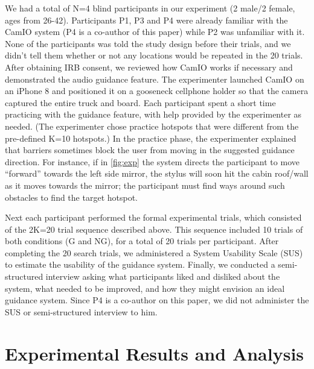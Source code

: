 \documentclass[runningheads]{res/templates/llncs}
\begin{document}
We had a total of N=4 blind participants in our experiment (2 male/2
female, ages from 26-42). Participants P1, P3 and P4 were already
familiar with the CamIO system (P4 is a co-author of this paper) while
P2 was unfamiliar with it. None of the participants was told the study
design before their trials, and we didn't tell them whether or not any
locations would be repeated in the 20 trials. After obtaining IRB
consent, we reviewed how CamIO works if necessary and demonstrated the
audio guidance feature. The experimenter launched CamIO on an iPhone 8
and positioned it on a gooseneck cellphone holder so that the camera
captured the entire truck and board. Each participant spent a short time
practicing with the guidance feature, with help provided by the
experimenter as needed. (The experimenter chose practice hotspots that
were different from the pre-defined K=10 hotspots.) In the practice
phase, the experimenter explained that barriers sometimes block the user
from moving in the suggested guidance direction. For instance, if in
\ref{fig:exp} the system directs the participant to move ``forward''
towards the left side mirror, the stylus will soon hit the cabin
roof/wall as it moves towards the mirror; the participant must find ways
around such obstacles to find the target hotspot.

Next each participant performed the formal experimental trials, which
consisted of the 2K=20 trial sequence described above. This sequence
included 10 trials of both conditions (G and NG), for a total of 20
trials per participant. After completing the 20 search trials, we
administered a System Usability Scale (SUS) \cite{brooke1996sus} to
estimate the usability of the guidance system. Finally, we conducted a
semi-structured interview asking what participants liked and disliked
about the system, what needed to be improved, and how they might
envision an ideal guidance system. Since P4 is a co-author on this
paper, we did not administer the SUS or semi-structured interview to
him.

\hypertarget{results}{%
\section{Experimental Results and Analysis}\label{results}}
\end{document}

